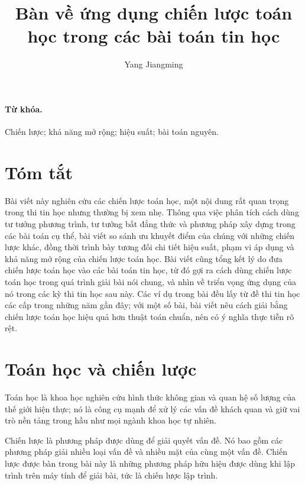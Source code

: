 \documentclass[11pt]{article}
\title{Bàn về ứng dụng chiến lược toán học trong các bài toán tin học}
\author{Yang Jiangming}
\date{}
\begin{document}
\maketitle


\paragraph{Từ khóa.}
Chiến lược; khả năng mở rộng; hiệu suất; bài toán nguyên.

\section*{Tóm tắt}

Bài viết này nghiên cứu các chiến lược toán học, một nội dung rất quan trọng
trong thi tin học nhưng thường bị xem nhẹ. Thông qua việc phân tích cách dùng
tư tưởng phương trình, tư tưởng bất đẳng thức và phương pháp xây dựng trong
các bài toán cụ thể, bài viết so sánh ưu khuyết điểm của chúng với những
chiến lược khác, đồng thời trình bày tương đối chi tiết hiệu suất, phạm vi áp
dụng và khả năng mở rộng của chiến lược toán học. Bài viết cũng tổng kết lý
do đưa chiến lược toán học vào các bài toán tin học, từ đó gợi ra cách dùng
chiến lược toán học trong quá trình giải bài nói chung, và nhìn về triển
vọng ứng dụng của nó trong các kỳ thi tin học sau này. Các ví dụ trong bài
đều lấy từ đề thi tin học các cấp trong những năm gần đây; với một số bài,
bài viết nêu cách giải bằng chiến lược toán học hiệu quả hơn thuật toán
chuẩn, nên có ý nghĩa thực tiễn rõ rệt.

\tableofcontents

\section{Toán học và chiến lược}

Toán học là khoa học nghiên cứu hình thức không gian và quan hệ số lượng của
thế giới hiện thực; nó là công cụ mạnh để xử lý các vấn đề khách quan và giữ
vai trò nền tảng trong hầu như mọi ngành khoa học tự nhiên.

Chiến lược là phương pháp được dùng để giải quyết vấn đề. Nó bao gồm các
phương pháp giải nhiều loại vấn đề và nhiều mặt của cùng một vấn đề. Chiến
lược được bàn trong bài này là những phương pháp hữu hiệu được dùng khi lập
trình trên máy tính để giải bài, tức là chiến lược lập trình.
\end{document}
